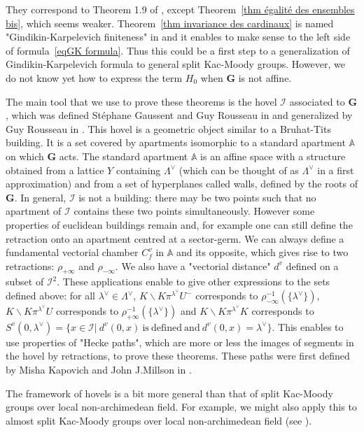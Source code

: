 \documentclass[12pt]{article}
\theoremstyle{plain}
\theoremstyle{definition}
\newcommand{\A}{\mathbb{A}}
\newcommand{\I}{\mathcal{I}}
\begin{document}
They correspond to Theorem 1.9 of \cite{braverman2014affine}, except Theorem~\ref{thm égalité des ensembles bis}, which seems weaker. Theorem~\ref{thm invariance des cardinaux} is named "Gindikin-Karpelevich finiteness" in \cite{braverman2014iwahori} and it enables to make sense to the left side of formula~\ref{eqGK formula}. Thus this could be a first step to a generalization of Gindikin-Karpelevich formula to general split Kac-Moody groups. However, we do not know yet how to express the term $H_0$ when $\textbf{G}$ is not affine.

\medskip

The main tool that we use to prove these theorems is the hovel $\I$ associated to $\textbf{G}$, which was defined Stéphane Gaussent and  Guy Rousseau in \cite{gaussent2014spherical} and generalized by Guy Rousseau in \cite{rousseau2012almost}. This hovel is a geometric object similar to a Bruhat-Tits building. It is a set covered by apartments isomorphic to a standard apartment $\A$ on which $\textbf{G}$ acts. The standard apartment $\A$ is an affine space with a structure obtained from a lattice $Y$ containing $\Lambda^\vee$ (which can be thought of as $\Lambda^\vee$ in a first approximation) and from a set of hyperplanes called walls, defined by the roots of $\textbf{G}$. In general, $\I$ is not a building: there may be two points such that no apartment of $\I$ contains these two points simultaneously. However some properties of euclidean buildings remain and, for example one can still define the retraction onto an apartment centred at a sector-germ. We can always define a fundamental vectorial chamber $C^v_f$ in $\A$ and its opposite, which gives rise to two retractions: $\rho_{+\infty}$ and $\rho_{-\infty}$. We also have a "vectorial distance" $d^v$ defined on a subset of $\I^2$. These applications enable to give other expressions to the sets defined above: for all $\lambda^\vee\in \Lambda^\vee$, $K\backslash K \pi^{\lambda^\vee} U^{-}$ corresponds to $\rho_{-\infty}^{-1}(\{\lambda^\vee\})$, $K\backslash K\pi^{\lambda^\vee} U$ corresponds to $\rho_{+\infty}^{-1}(\{\lambda^\vee\})$ and $K\backslash K\pi^{\lambda^\vee} K$ corresponds to $S^v(0,\lambda^\vee)=\{x\in \I|\ d^v(0,x)\mathrm{\ is\ defined\ and\ }d^v(0,x)=\lambda^\vee\}$. This enables to use properties of "Hecke paths", which are more or less the images of segments in the hovel by retractions, to prove these theorems. These paths were first defined by Misha Kapovich and John J.Millson in \cite{MR2415306}. 

The framework of hovels is a bit more general than that of split Kac-Moody groups over local non-archimedean field. For example, we might also apply this to almost split Kac-Moody groups over local non-archimedean field (see \cite{rousseau2012almost}). 
\end{document}
